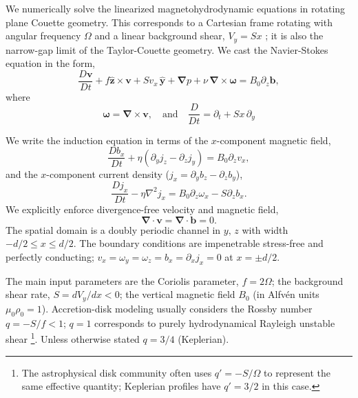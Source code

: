 \documentclass[openacc]{rsproca_new}%
\begin{document}
We numerically solve the linearized magnetohydrodynamic equations in rotating plane Couette geometry.
This corresponds to a Cartesian frame rotating with angular frequency $\Omega$ and a linear background shear, $V_{y}=Sx$ \cite{2015RSPSA.47140699V}; it is also the narrow-gap limit of the Taylor-Couette geometry.
We cast the Navier-Stokes equation in the form,
\begin{equation}\label{eq:mhd}
\frac{D \boldsymbol{v}}{Dt}+f \boldsymbol{\hat{z}}\times\boldsymbol{v}+{S}v_{x}\,\boldsymbol{\hat{y}}+\boldsymbol{\nabla}{p}+\nu\,\boldsymbol{\nabla}\times\boldsymbol{\omega}=B_{0}\partial_{z}\boldsymbol{b},
\end{equation}
where
\begin{equation}
\boldsymbol{\omega}=\boldsymbol{\nabla}\times\boldsymbol{v},\quad\text{and}\quad\frac{D}{Dt}=\partial_{t}+{S}x\,\partial_{y}\end{equation}

We write the induction equation in terms of the $x$-component magnetic field,
\begin{equation}\label{eq:Bx}
\frac{Db_{x}}{Dt}+\eta(\partial_{y}j_{z}-\partial_{z}j_{y})=B_{0}\partial_{z}v_{x},
\end{equation}
and the $x$-component current density ($j_{x}=\partial_{y}b_{z}-\partial_{z}b_{y}$),
\begin{equation}\label{eq:Jx}
\frac{Dj_{x}}{Dt}-\eta\nabla^{2}j_{x}=B_{0}\partial_{z}\omega_{x}-S\partial_{z}b_{x}.
\end{equation}
We explicitly enforce divergence-free velocity and magnetic field,
\begin{equation}\label{eq:divu}
 \boldsymbol{\nabla}\cdot\boldsymbol{v}=\boldsymbol{\nabla}\cdot\boldsymbol{b}=0.
\end{equation}
The spatial domain is a doubly periodic channel in $y,\,z$ with width $-d/2\le{x}\le d/2$.
The boundary conditions are impenetrable stress-free and perfectly conducting; $v_{x}=\omega_{y}=\omega_{z}=b_{x}=\partial_{x}j_{x}=0$ at $x=\pm{d/2}$. 

The main input parameters are the Coriolis parameter, $f=2 \Omega$; the background shear rate, $S=dV_{y}/dx<0$;  the vertical magnetic field $B_{0}$ (in Alfv\'{e}n units $\mu_{0}\rho_{0}=1$).
Accretion-disk modeling usually considers the Rossby number $q=-S/f<1$; $q=1$ corresponds to purely hydrodynamical Rayleigh unstable shear
\footnote{The astrophysical disk community often uses $q' = -S/\Omega$ to represent the same effective quantity; Keplerian profiles have $q' = 3/2$ in this case.}.
Unless otherwise stated $q=3/4$ (Keplerian).
\end{document}
